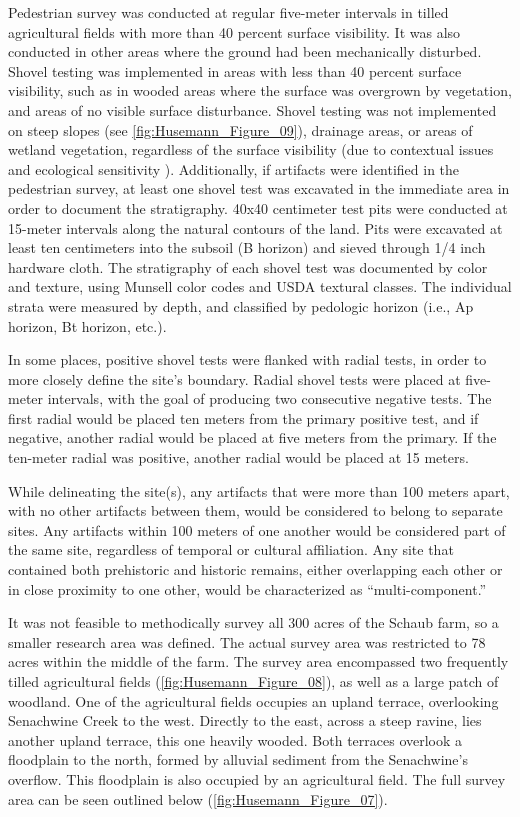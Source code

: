 Pedestrian survey was conducted at regular five-meter intervals in tilled agricultural fields with more than 40 percent surface visibility. It was also conducted in other areas where the ground had been mechanically disturbed.
Shovel testing was implemented in areas with less than 40 percent surface visibility, such as in wooded areas where the surface was overgrown by vegetation, and areas of no visible surface disturbance. Shovel testing was not implemented on steep slopes (see \cref{fig:Husemann_Figure_09}), drainage areas, or areas of wetland vegetation, regardless of the surface visibility (due to contextual issues and ecological sensitivity ). Additionally, if artifacts were identified in the pedestrian survey, at least one shovel test was excavated in the immediate area in order to document the stratigraphy.
40x40 centimeter test pits were conducted at 15-meter intervals along the natural contours of the land. Pits were excavated at least ten centimeters into the subsoil (B horizon) and sieved through 1/4 inch hardware cloth. The stratigraphy of each shovel test was documented by color and texture, using Munsell color codes and USDA textural classes. The individual strata were measured by depth, and classified by pedologic horizon (i.e., Ap horizon, Bt horizon, etc.).

In some places, positive shovel tests were flanked with radial tests, in order to more closely define the site’s boundary. Radial shovel tests were placed at five-meter intervals, with the goal of producing two consecutive negative tests. The first radial would be placed ten meters from the primary positive test, and if negative, another radial would be placed at five meters from the primary. If the ten-meter radial was positive, another radial would be placed at 15 meters.

While delineating the site(s), any artifacts that were more than 100 meters apart, with no other artifacts between them, would be considered to belong to separate sites. Any artifacts within 100 meters of one another would be considered part of the same site, regardless of temporal or cultural affiliation. Any site that contained both prehistoric and historic remains, either overlapping each other or in close proximity to one other, would be characterized as “multi-component.”

It was not feasible to methodically survey all 300 acres of the Schaub farm, so a smaller research area was defined. The actual survey area was restricted to 78 acres within the middle of the farm. The survey area encompassed two frequently tilled agricultural fields (\cref{fig:Husemann_Figure_08}), as well as a large patch of woodland. One of the agricultural fields occupies an upland terrace, overlooking Senachwine Creek to the west. Directly to the east, across a steep ravine, lies another upland terrace, this one heavily wooded.  Both terraces overlook a floodplain to the north, formed by alluvial sediment from the Senachwine’s overflow. This floodplain is also occupied by an agricultural field.  The full survey area can be seen outlined below (\cref{fig:Husemann_Figure_07}).

